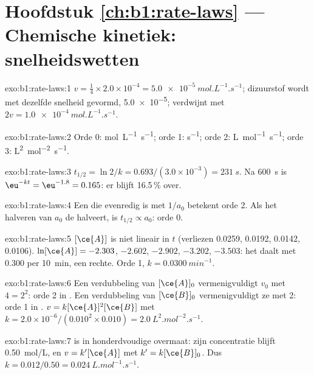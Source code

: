 \section*{Hoofdstuk \ref{ch:b1:rate-laws} --- Chemische kinetiek: snelheidswetten}

\begin{solution}{exo:b1:rate-laws:1}
$v = \frac14 \times 2.0 \times 10^{-4} = \qty{5.0e-5}{mol.L^{-1}.s^{-1}}$;
dizuurstof wordt met dezelfde snelheid gevormd, \qty{5.0e-5}{};
 verdwijnt met
$2v = \qty{1.0e-4}{mol.L^{-1}.s^{-1}}$.
\end{solution}

\begin{solution}{exo:b1:rate-laws:2}
Orde 0: \unit{mol.L^{-1}.s^{-1}}; orde 1: \unit{s^{-1}}; orde 2:
\unit{L.mol^{-1}.s^{-1}}; orde 3: \unit{L^2.mol^{-2}.s^{-1}}.
\end{solution}

\begin{solution}{exo:b1:rate-laws:3}
$t_{1/2} = \ln2/k = 0.693/(3.0 \times 10^{-3}) = \qty{231}{s}$. Na
\qty{600}{s} is $\eu^{-kt} = \eu^{-1.8} = 0.165$: er blijft 16.5\,\%
over.
\end{solution}

\begin{solution}{exo:b1:rate-laws:4}
Een  die evenredig is met $1/a_0$ betekent orde 2. Als het
halveren van $a_0$ de  halveert, is $t_{1/2} \propto a_0$:
orde 0.
\end{solution}

\begin{solution}{exo:b1:rate-laws:5}
$[\ce{A}]$ is niet lineair in $t$ (verliezen 0.0259, 0.0192, 0.0142,
0.0106). $\ln[\ce{A}] = -2.303$, $-2.602$, $-2.902$, $-3.202$, $-3.503$:
het daalt met 0.300 per \qty{10}{min}, een rechte. Orde 1, $k =
\qty{0.0300}{min^{-1}}$.
\end{solution}

\begin{solution}{exo:b1:rate-laws:6}
Een verdubbeling van $[\ce{A}]_0$ vermenigvuldigt $v_0$ met $4 = 2^2$:
orde 2 in . Een verdubbeling van $[\ce{B}]_0$ vermenigvuldigt ze
met 2: orde 1 in . $v =
k[\ce{A}]^2[\ce{B}]$ met $k = 2.0 \times 10^{-6}/(0.010^2 \times 0.010) =
\qty{2.0}{L^2.mol^{-2}.s^{-1}}$.
\end{solution}

\begin{solution}{exo:b1:rate-laws:7}
 is in honderdvoudige overmaat: zijn concentratie blijft
\qty{0.50}{mol/L}, en $v = k'[\ce{A}]$ met $k' = k[\ce{B}]_0$. Dus
$k = 0.012/0.50 = \qty{0.024}{L.mol^{-1}.s^{-1}}$.
\end{solution}

